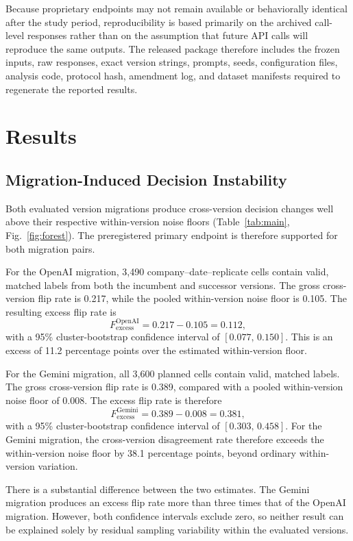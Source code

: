 \documentclass[11pt]{article}
\begin{document}
Because proprietary endpoints may not remain available or behaviorally identical after the study period, reproducibility is based primarily on the archived call-level responses rather than on the assumption that future API calls will reproduce the same outputs. The released package therefore includes the frozen inputs, raw responses, exact version strings, prompts, seeds, configuration files, analysis code, protocol hash, amendment log, and dataset manifests required to regenerate the reported results.

\section{Results}
\subsection{Migration-Induced Decision Instability}
Both evaluated version migrations produce cross-version decision changes well above their respective within-version noise floors (Table~\ref{tab:main}, Fig.~\ref{fig:forest}). The preregistered primary endpoint is therefore supported for both migration pairs.

For the OpenAI migration, 3{,}490 company--date--replicate cells contain valid, matched labels from both the incumbent and successor versions. The gross cross-version flip rate is 0.217, while the pooled within-version noise floor is 0.105. The resulting excess flip rate is
\begin{equation}
F_{\mathrm{excess}}^{\mathrm{OpenAI}} = 0.217-0.105 = 0.112,
\end{equation}
with a 95\% cluster-bootstrap confidence interval of $[0.077,\,0.150]$. This is an excess of 11.2 percentage points over the estimated within-version floor.

For the Gemini migration, all 3{,}600 planned cells contain valid, matched labels. The gross cross-version flip rate is 0.389, compared with a pooled within-version noise floor of 0.008. The excess flip rate is therefore
\begin{equation}
F_{\mathrm{excess}}^{\mathrm{Gemini}} = 0.389-0.008 = 0.381,
\end{equation}
with a 95\% cluster-bootstrap confidence interval of $[0.303,\,0.458]$. For the Gemini migration, the cross-version disagreement rate therefore exceeds the within-version noise floor by 38.1 percentage points, beyond ordinary within-version variation.

There is a substantial difference between the two estimates. The Gemini migration produces an excess flip rate more than three times that of the OpenAI migration. However, both confidence intervals exclude zero, so neither result can be explained solely by residual sampling variability within the evaluated versions.
\end{document}
